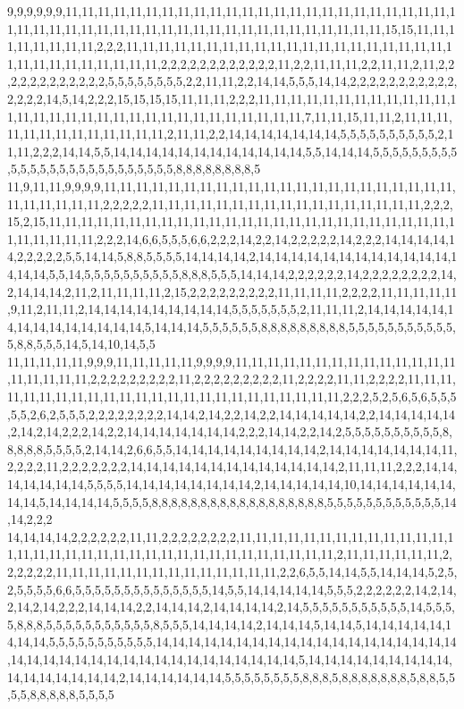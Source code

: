 9,9,9,9,9,9,11,11,11,11,11,11,11,11,11,11,11,11,11,11,11,11,11,11,11,11,11,11,11,11,11,11,11,11,11,11,11,11,11,11,11,11,11,11,11,11,11,11,11,11,11,11,11,11,15,15,11,11,11,11,11,11,11,11,2,2,2,11,11,11,11,11,11,11,11,11,11,11,11,11,11,11,11,11,11,11,11,11,11,11,11,11,11,11,11,11,11,2,2,2,2,2,2,2,2,2,2,2,2,11,2,2,11,11,11,2,2,11,11,2,11,2,2,2,2,2,2,2,2,2,2,2,2,5,5,5,5,5,5,5,5,2,2,11,11,2,2,14,14,5,5,5,14,14,2,2,2,2,2,2,2,2,2,2,2,2,2,2,2,14,5,14,2,2,2,15,15,15,15,11,11,11,2,2,2,11,11,11,11,11,11,11,11,11,11,11,11,11,11,11,11,11,11,11,11,11,11,11,11,11,11,11,11,11,11,11,7,11,11,15,11,11,2,11,11,11,11,11,11,11,11,11,11,11,11,11,2,11,11,2,2,14,14,14,14,14,14,14,5,5,5,5,5,5,5,5,5,5,2,11,11,2,2,2,14,14,5,5,14,14,14,14,14,14,14,14,14,14,14,14,5,5,14,14,14,5,5,5,5,5,5,5,5,5,5,5,5,5,5,5,5,5,5,5,5,5,5,5,5,5,5,8,8,8,8,8,8,8,8,5
11,9,11,11,9,9,9,9,11,11,11,11,11,11,11,11,11,11,11,11,11,11,11,11,11,11,11,11,11,11,11,11,11,11,11,11,2,2,2,2,2,11,11,11,11,11,11,11,11,11,11,11,11,11,11,11,11,11,2,2,2,15,2,15,11,11,11,11,11,11,11,11,11,11,11,11,11,11,11,11,11,11,11,11,11,11,11,11,11,11,11,11,11,11,11,2,2,2,14,6,6,5,5,5,6,6,2,2,2,14,2,2,14,2,2,2,2,2,14,2,2,2,14,14,14,14,14,2,2,2,2,2,5,5,14,14,5,8,8,5,5,5,5,14,14,14,14,2,14,14,14,14,14,14,14,14,14,14,14,14,14,14,14,5,5,14,5,5,5,5,5,5,5,5,5,5,8,8,8,5,5,5,14,14,14,2,2,2,2,2,2,14,2,2,2,2,2,2,2,2,14,2,14,14,14,2,11,2,11,11,11,11,2,15,2,2,2,2,2,2,2,2,2,11,11,11,11,2,2,2,2,11,11,11,11,11,9,11,2,11,11,2,14,14,14,14,14,14,14,14,14,5,5,5,5,5,5,5,2,11,11,11,2,14,14,14,14,14,14,14,14,14,14,14,14,14,14,5,14,14,14,5,5,5,5,5,5,8,8,8,8,8,8,8,8,8,5,5,5,5,5,5,5,5,5,5,5,5,8,8,5,5,5,14,5,14,10,14,5,5
11,11,11,11,11,9,9,9,11,11,11,11,11,9,9,9,9,11,11,11,11,11,11,11,11,11,11,11,11,11,11,11,11,11,11,11,2,2,2,2,2,2,2,2,2,11,2,2,2,2,2,2,2,2,2,11,2,2,2,2,11,11,2,2,2,2,11,11,11,11,11,11,11,11,11,11,11,11,11,11,11,11,11,11,11,11,11,11,11,11,2,2,2,5,2,5,6,5,6,5,5,5,5,5,2,6,2,5,5,5,2,2,2,2,2,2,2,2,14,14,2,14,2,2,14,2,2,14,14,14,14,14,2,2,14,14,14,14,14,2,14,2,14,2,2,2,14,2,2,14,14,14,14,14,14,14,2,2,2,14,14,2,2,14,2,5,5,5,5,5,5,5,5,5,5,8,8,8,8,8,5,5,5,5,2,14,14,2,6,6,5,5,14,14,14,14,14,14,14,14,14,2,14,14,14,14,14,14,14,11,2,2,2,2,11,2,2,2,2,2,2,2,14,14,14,14,14,14,14,14,14,14,14,14,14,2,11,11,11,2,2,2,14,14,14,14,14,14,14,5,5,5,5,14,14,14,14,14,14,14,14,2,14,14,14,14,14,10,14,14,14,14,14,14,14,14,5,14,14,14,14,5,5,5,5,8,8,8,8,8,8,8,8,8,8,8,8,8,8,8,8,8,8,5,5,5,5,5,5,5,5,5,5,5,5,14,14,2,2,2
14,14,14,14,2,2,2,2,2,2,11,11,2,2,2,2,2,2,2,2,11,11,11,11,11,11,11,11,11,11,11,11,11,11,11,11,11,11,11,11,11,11,11,11,11,11,11,11,11,11,11,11,11,11,2,11,11,11,11,11,11,2,2,2,2,2,2,11,11,11,11,11,11,11,11,11,11,11,11,11,11,2,2,6,5,5,14,14,5,5,14,14,14,5,2,5,2,5,5,5,5,6,6,5,5,5,5,5,5,5,5,5,5,5,5,5,5,14,5,5,14,14,14,14,14,5,5,5,2,2,2,2,2,2,14,2,14,2,14,2,14,2,2,2,14,14,14,2,2,14,14,14,2,14,14,14,14,2,14,5,5,5,5,5,5,5,5,5,5,5,14,5,5,5,5,8,8,8,5,5,5,5,5,5,5,5,5,5,5,8,5,5,5,14,14,14,14,2,14,14,14,5,14,14,5,14,14,14,14,14,14,14,14,5,5,5,5,5,5,5,5,5,5,5,14,14,14,14,14,14,14,14,14,14,14,14,14,14,14,14,14,14,14,14,14,14,14,14,14,14,14,14,14,14,14,14,14,14,14,14,14,5,14,14,14,14,14,14,14,14,14,14,14,14,14,14,14,14,2,14,14,14,14,14,14,5,5,5,5,5,5,5,5,8,8,8,5,8,8,8,8,8,8,8,5,8,8,5,5,5,5,8,8,8,8,8,5,5,5,5
